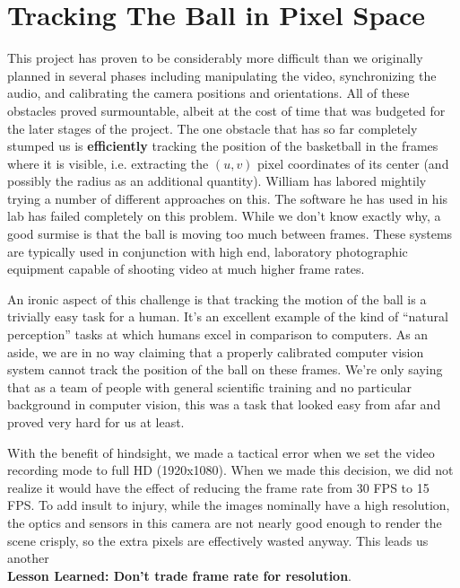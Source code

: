 \documentclass{article}
\begin{document}
\section{Tracking The Ball in Pixel Space}
This project has proven to be considerably more difficult than we originally planned in several phases
including manipulating the video, synchronizing the audio, and calibrating the camera positions and orientations.   
All of these obstacles proved surmountable, albeit at the cost of time that was budgeted for the later stages of the project.
The one obstacle that has so far completely stumped us is \textbf{efficiently} 
tracking the position of the basketball in the frames where it is visible, 
i.e. extracting the $(u, v)$ pixel coordinates of its center (and possibly the radius as an additional quantity).
William has labored mightily trying a number of different approaches on this.
The software he has used in his lab has failed completely on this problem.
While we don't know exactly why, a good surmise is that the ball is moving too much between frames.
These systems are typically used in conjunction with high end, 
laboratory photographic equipment capable of shooting video at much higher frame rates.

An ironic aspect of this challenge is that tracking the motion of the ball is a trivially easy task for a human.  
It's an excellent example of the kind of ``natural perception'' tasks at which humans excel in comparison to computers.
As an aside, we are in no way claiming that a properly calibrated 
computer vision system cannot track the position of the ball on these frames.
We're only saying that as a team of people with general scientific training and no
particular background in computer vision, this was a task that looked easy from afar
and proved very hard for us at least.

With the benefit of hindsight, we made a tactical error when we 
set the video recording mode to full HD (1920x1080).  
When we made this decision, we did not realize it would have the effect of
reducing the frame rate from 30 FPS to 15 FPS.  
To add insult to injury, while the images nominally have a high resolution,
the optics and sensors in this camera are not nearly good enough to render 
the scene crisply, so the extra pixels are effectively wasted anyway.
This leads us another\\
\textbf{Lesson Learned: Don't trade frame rate for resolution}.
\end{document}
